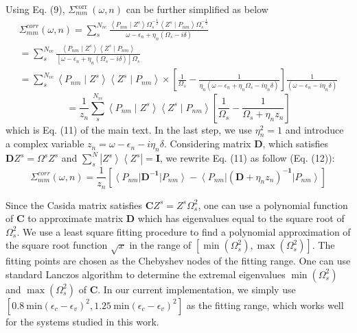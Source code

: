 Using Eq. (9), $\Sigma_{m m}^{\text {corr }}(\omega, n)$ can be further simplified as below
$$
\begin{gathered}
\Sigma_{m m}^{c o r r}(\omega, n)=\sum_s^{N_{v c}} \frac{\left\langle P_{n m} \mid Z^s\right\rangle \Omega_s^{-\frac{1}{2}}\left\langle Z^s \mid P_{n m}\right\rangle \Omega_s^{-\frac{1}{2}}}{\omega-\epsilon_n+\eta_n\left(\Omega_s-i \delta\right)} \\
=\sum_s^{N_{v c}} \frac{\left\langle P_{n m} \mid Z^s\right\rangle\left\langle Z^s \mid P_{n m}\right\rangle}{\left[\omega-\epsilon_n+\eta_n\left(\Omega_s-i \delta\right)\right] \Omega_s} \\
=\sum_s^{N_{v c}}\left\langle P_{n m} \mid Z^s\right\rangle\left\langle Z^s \mid P_{n m}\right\rangle \times\left[\frac{1}{\Omega_s}-\frac{1}{\eta_n\left(\omega-\epsilon_n+\eta_n \Omega_s-i \eta_n \delta\right)}\right] \frac{1}{\left(\omega-\epsilon_n-i \eta_n \delta\right)}
\end{gathered}
$$
$$
=\frac{1}{z_n} \sum_s^{N_{v c}}\left\langle P_{n m} \mid Z^s\right\rangle\left\langle Z^s \mid P_{n m}\right\rangle\left[\frac{1}{\Omega_s}-\frac{1}{\Omega_s+\eta_n z_n}\right]
$$
which is Eq. (11) of the main text. In the last step, we use $\eta_n^2=1$ and introduce a complex variable $z_n=\omega-\epsilon_n-i \eta_n \delta$. Considering matrix $\mathbf{D}$, which satisfies $\mathbf{D} Z^s=\Omega^s Z^s$ and $\sum_s^N\left|Z^s\right\rangle\left\langle Z^s\right|=\mathbf{I}$, we rewrite Eq. (11) as follow (Eq. (12)):
$$
\Sigma_{m m}^{c o r r}(\omega, n)=\frac{1}{z_n}\left[\left\langle P_{n m}\right| \mathbf{D}^{-\mathbf{1}}\left|P_{n m}\right\rangle-\left\langle P_{n m}\right|\left(\mathbf{D}+\eta_n z_n\right)^{-\mathbf{1}}\left|P_{n m}\right\rangle\right]
$$

Since the Casida matrix satisfies $\mathbf{C} Z^s=Z^s \Omega_s^2$, one can use a polynomial function of $\mathbf{C}$ to approximate matrix $\mathbf{D}$ which has eigenvalues equal to the square root of $\Omega_s^2$. We use a least square fitting procedure to find a polynomial approximation of the square root function $\sqrt{x}$ in the range of $\left[\min \left(\Omega_s^2\right), \max \left(\Omega_s^2\right)\right]$. The fitting points are chosen as the Chebyshev nodes of the fitting range. One can use standard Lanczos algorithm to determine the extremal eigenvalues $\min \left(\Omega_s^2\right)$ and $\max \left(\Omega_s^2\right)$ of $\mathbf{C}$. In our current implementation, we simply use $\left[0.8 \mathrm{~min}\left(\epsilon_c-\epsilon_v\right)^2, 1.25 \mathrm{~min}\left(\epsilon_c-\epsilon_v\right)^2\right]$ as the fitting range, which works well for the systems studied in this work.